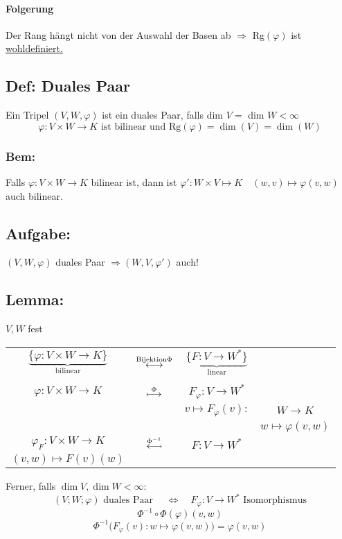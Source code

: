 \documentclass[titlepage,12pt,a4paper,ngerman]{report}
\newcommand{\tx}[1]{\textrm{#1}}
\newcommand{\ub}[1]{\underbrace{#1}}
\begin{document}
\paragraph{Folgerung}
Der Rang hängt nicht von der Auswahl der Basen ab $\Rightarrow$ Rg$(\varphi)$ ist \underline{wohldefiniert.}

\subsection{Def: Duales Paar}
Ein Tripel $(V,W,\varphi)$ ist ein duales Paar, falls dim $V =$ dim $W < \infty $
$$\varphi: V \times W \to K \tx{ ist bilinear und Rg}(\varphi) = \dim (V) = \dim (W)$$


\subsubsection*{Bem:} Falls $ \varphi: V \times W \to K $ bilinear ist, dann ist $ \varphi': W \times V \mapsto K \quad (w,v) \mapsto \varphi(v,w)$ auch bilinear.
\subsection*{Aufgabe:}
$ (V,W,\varphi) $ duales Paar $ \Rightarrow (W,V,\varphi') $ auch!
\subsection{Lemma:} $ V,W $ fest
\begin{center}
	\begin{tabular}{cccc}
		$ \ub{\{\varphi: V\times W \to K \}}_{\tx{bilinear}} $ & $ \buildrel \tx{Bijektion} \Phi \over \longleftrightarrow$ & $ \ub{\{F: V \to W^*\}}_{\tx{linear}} $ & $  $\\
		\\
		$ \varphi: V \times W \to K $ & $ \buildrel \Phi \over \longmapsto $ & $ F_\varphi: V \to W^* $ & $  $\\
		$  $ & $  $ & $ v \mapsto F_\varphi (v) : $ & $ W \to K $\\
		$  $ & $  $ & $  $ & $ w \mapsto \varphi(v,w) $\\
		$ \varphi_F : V \times W \to K $ & $ \buildrel \Phi ^{-1} \over{\reflectbox{$\longmapsto$}}$ & $ F: V \to W^* $ & $  $\\
		$ (v,w) \mapsto F(v)(w) $ & $  $ & $  $ & $  $\\
	\end{tabular}
\end{center}
Ferner, falls $ \dim V, \dim W < \infty $:\\
$$ (V;W;\varphi) \tx{ duales Paar } \quad \Leftrightarrow \quad F_\varphi : V \to W^* \tx{ Isomorphismus}$$
$$\Phi^{-1} \circ \Phi (\varphi)(v,w)$$
$$\Phi^{-1}\bigg(F_\varphi(v):w\mapsto\varphi(v,w)\bigg) = \varphi(v,w)$$   
\end{document}
